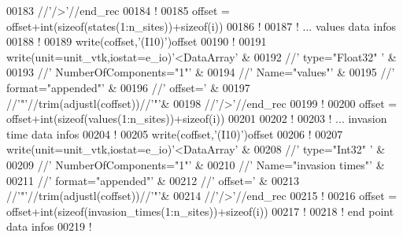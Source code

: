 \begin{DoxyCode}
00183                                 //\textcolor{stringliteral}{'/>'}//end\_rec
00184 \textcolor{comment}{!}
00185 offset = offset+int(sizeof(states(1:n\_sites))+sizeof(i))
00186 \textcolor{comment}{!}
00187 \textcolor{comment}{! ... values data infos}
00188 \textcolor{comment}{!}
00189 \textcolor{keyword}{write}(coffset,\textcolor{stringliteral}{'(I10)'})offset
00190 \textcolor{comment}{!}
00191 \textcolor{keyword}{write}(unit=unit\_vtk,iostat=e\_io)\textcolor{stringliteral}{'<DataArray'}                      &
00192                                 //\textcolor{stringliteral}{' type="Float32" '}              &
00193                                 //\textcolor{stringliteral}{' NumberOfComponents="1"'}       &
00194                                 //\textcolor{stringliteral}{' Name="values"'}                &
00195                                 //\textcolor{stringliteral}{' format="appended"'}            &
00196                                 //\textcolor{stringliteral}{' offset='}                      &
00197                                 //\textcolor{stringliteral}{'"'}//trim(adjustl(coffset))//\textcolor{stringliteral}{'"'}&
00198                                 //\textcolor{stringliteral}{'/>'}//end\_rec
00199 \textcolor{comment}{!}
00200 offset = offset+int(sizeof(values(1:n\_sites))+sizeof(i))
00201 
00202 \textcolor{comment}{!}
00203 \textcolor{comment}{! ... invasion time data infos}
00204 \textcolor{comment}{!}
00205 \textcolor{keyword}{write}(coffset,\textcolor{stringliteral}{'(I10)'})offset
00206 \textcolor{comment}{!}
00207 \textcolor{keyword}{write}(unit=unit\_vtk,iostat=e\_io)\textcolor{stringliteral}{'<DataArray'}                      &
00208                                 //\textcolor{stringliteral}{' type="Int32" '}              &
00209                                 //\textcolor{stringliteral}{' NumberOfComponents="1"'}       &
00210                                 //\textcolor{stringliteral}{' Name="invasion times"'}                &
00211                                 //\textcolor{stringliteral}{' format="appended"'}            &
00212                                 //\textcolor{stringliteral}{' offset='}                      &
00213                                 //\textcolor{stringliteral}{'"'}//trim(adjustl(coffset))//\textcolor{stringliteral}{'"'}&
00214                                 //\textcolor{stringliteral}{'/>'}//end\_rec
00215 \textcolor{comment}{!}
00216 offset = offset+int(sizeof(invasion\_times(1:n\_sites))+sizeof(i))
00217 \textcolor{comment}{!}
00218 \textcolor{comment}{! end point data infos}
00219 \textcolor{comment}{!}

\end{DoxyCode}
